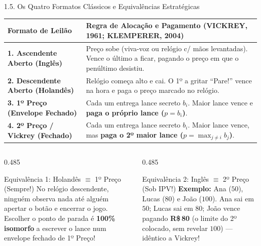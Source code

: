 \documentclass[aspectratio=169, 10pt]{beamer}
\newcommand{\exbox}[2]{%
  \begin{exampleblock}{#1}
    \footnotesize\setlength{\abovedisplayskip}{4pt}\setlength{\belowdisplayskip}{4pt}
    #2\par
  \end{exampleblock}%
}
\begin{document}
\begin{frame}{1.5. Os Quatro Formatos Clássicos e Equivalências Estratégicas}
  \footnotesize
  \begin{table}
    \centering
    \begin{tabular}{p{4.3cm} p{9.8cm}}
      \toprule
      \textbf{Formato de Leilão} & \textbf{Regra de Alocação e
      Pagamento (VICKREY, 1961; KLEMPERER, 2004)} \\
      \midrule
      \textbf{1. Ascendente Aberto (Inglês)} & Preço sobe (viva-voz
      ou relógio c/ mãos levantadas). Vence o último a ficar, pagando
      o preço em que o penúltimo desistiu. \\
      \textbf{2. Descendente Aberto (Holandês)} & Relógio começa alto
      e cai. O 1º a gritar ``Pare!'' vence na hora e paga o preço
      marcado no relógio. \\
      \textbf{3. 1º Preço (Envelope Fechado)} & Cada um entrega lance
      secreto $b_i$. Maior lance vence e \textbf{paga o próprio lance
      ($p = b_i$)}. \\
      \textbf{4. 2º Preço / Vickrey (Fechado)} & Cada um entrega
      lance secreto $b_i$. Maior lance vence, mas \textbf{paga o 2º
      maior lance ($p = \max_{j \neq i} b_j$)}. \\
      \bottomrule
    \end{tabular}
  \end{table}
  \vspace{-0.15cm}
  \begin{columns}[T, onlytextwidth]
    \begin{column}{0.485\textwidth}
      \exbox{Equivalência 1: Holandês $\equiv$ 1º Preço (Sempre!)}{%
        No relógio descendente, ninguém observa nada até alguém
        apertar o botão e encerrar o jogo. Escolher o ponto de parada
        é \textbf{100\% isomorfo} a escrever o lance num envelope
        fechado de 1º Preço!
      }
    \end{column}
    \begin{column}{0.485\textwidth}
      \exbox{Equivalência 2: Inglês $\equiv$ 2º Preço (Sob IPV!)}{%
        \textbf{Exemplo:} Ana ($50$), Lucas ($80$) e João ($100$).
        Ana sai em $50$; Lucas sai em $80$; João vence pagando
        \textbf{R\$\,80} (o limite do 2º colocado, sem revelar $100$)
        --- idêntico a Vickrey!
      }
    \end{column}
  \end{columns}
\end{frame}
\end{document}
